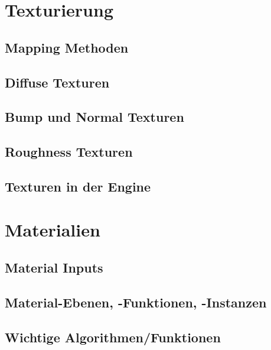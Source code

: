 \section{Texturierung}
\label{sec:tex}

\subsection{Mapping Methoden}
\label{sec:tex_mapping}

\subsection{Diffuse Texturen}
\label{sec:tex_diffuse}

\subsection{Bump und Normal Texturen}
\label{sec:tex_normal}

\subsection{Roughness Texturen}
\label{sec:tex_roughness}

\subsection{Texturen in der Engine}
\label{sec:tex_inside_engine}

\section{Materialien}
\label{sec:materials}

\subsection{Material Inputs}
\label{sec:mat_inputs}

\subsection{Material-Ebenen, -Funktionen, -Instanzen}
\label{sec:mat_lay_func_ins}

\subsection{Wichtige Algorithmen/Funktionen}
\label{sec:algorithms}

